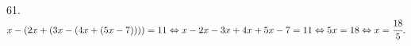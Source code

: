 61. $x-(2x+(3x-(4x+(5x-7))))=11\Leftrightarrow x-2x-3x+4x+5x-7=11\Leftrightarrow5x=18\Leftrightarrow x=\cfrac{18}{5}.$\\

